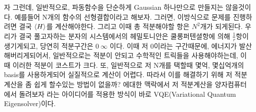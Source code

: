 \documentclass[10pt]{article}
\begin{document}
\begin{enumerate}[label=2)]
자 그런데, 일반적으로, 파동함수을 단순하게 Gaussian 하나만으로 만들지는 않을것이다. 
예를들어 N개의 함수의 선형결합이라고 해보자. 
그러면, 이방식으로 문제를 진행하려면 결국 \(\langle H \rangle \\\)를 계산해야한다. 그리고 이때 총 적분해야할 항은 \(N^2\)개가 되게된다. 
우리가 결국 풀고자하는 분자의 시스템에서의 헤밀토니안은 쿨롱퍼텐셜항에 의해 \(\frac{1}{r}\)항이 생기게되고, 당연히 적분구간은 \(0~\infty\) 이다. 
이때 저 0이라는 구간때문에, 에너지가 발산해버리게되어서, 일반적으로는 적분이 안되고 수학적인 트릭들을 사용해야하는데, 이때 이러한 적분이 코스트가 크다. 
또, 일반적으로 저 N개를 택할때 몇억, 몇십억개의 basis를 사용하게되어 실질적으로 계산이 어렵다. 
따라서 이를 해결하기 위해 저 적분계산을 좀 쉽게 할수있는 방법이 없을까? 에대한 맥락에서 저 적분계산을 양자컴퓨터에서 돌려보자 라는 아이디어를 적용한 방식이 바로 VQE(Variational Quantum Eigensolver)이다. 

\vspace{\baselineskip}
\end{enumerate}
\end{document}
